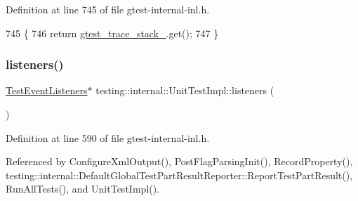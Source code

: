Definition at line 745 of file gtest-\/internal-\/inl.\+h.


\begin{DoxyCode}
745                                                         \{
746     \textcolor{keywordflow}{return} \hyperlink{classtesting_1_1internal_1_1UnitTestImpl_a73a797cf2b20129cb252b14c5fd9a0af}{gtest\_trace\_stack\_}.get();
747   \}
\end{DoxyCode}
\mbox{\label{classtesting_1_1internal_1_1UnitTestImpl_a67211f8475936f88d0e4d30f841c0da4}} 
\subsubsection{\texorpdfstring{listeners()}{listeners()}}
{\footnotesize\ttfamily \hyperlink{classtesting_1_1TestEventListeners}{Test\+Event\+Listeners}$\ast$ testing\+::internal\+::\+Unit\+Test\+Impl\+::listeners (\begin{DoxyParamCaption}{ }\end{DoxyParamCaption})\hspace{0.3cm}{\ttfamily [inline]}}



Definition at line 590 of file gtest-\/internal-\/inl.\+h.



Referenced by Configure\+Xml\+Output(), Post\+Flag\+Parsing\+Init(), Record\+Property(), testing\+::internal\+::\+Default\+Global\+Test\+Part\+Result\+Reporter\+::\+Report\+Test\+Part\+Result(), Run\+All\+Tests(), and Unit\+Test\+Impl().


